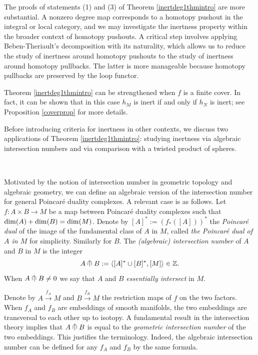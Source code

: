 \documentclass[a4]{amsart}
\theoremstyle{definition}
\newcommand{\testcap}{\mathrel{\vcenter{\offinterlineskip
\hbox{$\cap$}\vskip-1.8ex\hbox{$\kern0.2em | \kern0.15em$}}}}
\begin{document}
\begin{sloppypar}
The proofs of statements (1) and (3) of Theorem \ref{inertdeg1thmintro} are more substantial. A nonzero degree map corresponds to a homotopy pushout in the integral or local category, and we may investigate the inertness property within the broader context of homotopy pushouts. A critical step involves applying Beben-Theriault's decomposition \cite{BT22} with its naturality, which allows us to reduce the study of inertness around homotopy pushouts to the study of inertness around homotopy pullbacks. The latter is more manageable because homotopy pullbacks are preserved by the loop functor. 


Theorem \ref{inertdeg1thmintro} can be strengthened when $f$ is a finite cover. In fact, it can be shown that in this case $h_M$ is inert if and only if $h_N$ is inert; see Proposition \ref{coverprop} for more details. 

Before introducing criteria for inertness in other contexts, we discuss two applications of Theorem \ref{inertdeg1thmintro}: studying inertness via algebraic intersection numbers and via comparison with a twisted product of spheres. 



$\, $

Motivated by the notion of intersection number in geometric topology and algebraic geometry, we can define an algebraic version of the intersection number for general Poincar\'{e} duality complexes. A relevant case is as follows. 
Let $f: A\times B\longrightarrow M$ be a map between Poincar\'{e} duality complexes such that ${\rm dim}(A)+{\rm dim}(B)= {\rm dim}(M)$. 
Denote by $[A]^\ast:=(f_{\ast}([A]))^\ast$ the {\it Poincar\'{e} dual} of the image of the fundamental class of $A$ in $M$, called {\it the Poincar\'{e} dual of $A$ in $M$} for simplicity. Similarly for $B$. 
The {\it (algebraic) intersection number} of $A$ and $B$ in $M$ is the integer
\[\label{int=1eqintro}
A \testcap B:= \langle [A]^\ast \cup [B]^\ast, [M]\rangle\in \mathbb{Z}.
\]
When $A \testcap B\neq 0$ we say that $A$ and $B$ {\it essentially intersect} in $M$. 

Denote by $A\stackrel{f_A}{\longrightarrow} M$ and $B\stackrel{f_B}{\longrightarrow} M$ the restriction maps of $f$ on the two factors. When $f_A$ and $f_B$ are embeddings of smooth manifolds, the two embeddings are transversal to each other up to isotopy. A fundamental result in the intersection theory implies that $A \testcap B$ is equal to the {\it geometric intersection number} of the two embeddings. This justifies the terminology. Indeed, the algebraic intersection number can be defined for any $f_A$ and $f_B$ by the same formula. 


\end{sloppypar}
\end{document}
